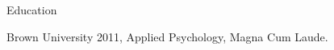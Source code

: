 \documentclass[12pt]{res}
\begin{document}
{\begin{resume}
\begin{list}{}{\leftmargin=1em}
{\begin{list}{-}{\leftmargin=1em}
\end{list}}
\item
\item{\dotfill Education\dotfill 
\begin{list}{-}{\leftmargin=1em}
\item Brown University 2011, Applied Psychology, Magna Cum Laude. 
\end{list}}
\item
\item
\end{list}

\end{resume}
} %
\end{document}
